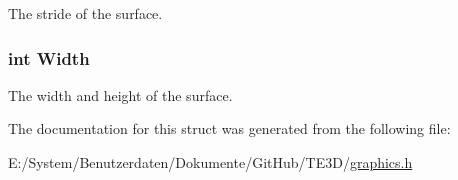 The stride of the surface. 

\hypertarget{struct_t_e3_d___surface_abbe7749c3b402f7dfe64f936774cfcd4}{
\subsubsection[{Width}]{\setlength{\rightskip}{0pt plus 5cm}int Width}}\label{struct_t_e3_d___surface_abbe7749c3b402f7dfe64f936774cfcd4}


The width and height of the surface. 



The documentation for this struct was generated from the following file\-:\begin{DoxyCompactItemize}
\item 
E\-:/\-System/\-Benutzerdaten/\-Dokumente/\-Git\-Hub/\-T\-E3\-D/\hyperlink{graphics_8h}{graphics.\-h}\end{DoxyCompactItemize}
